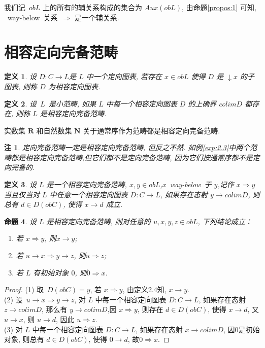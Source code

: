 \documentclass[c5size,a4paper,hyperref,fancyhdr,UTF8]{ctexart}
\theoremstyle{nonumberplain}
\newtheorem{proof}{证明}
\newtheorem{notation}{注}
\newtheorem{definition}{定义}[section]
\newtheorem{proposition}[definition]{命题}
\theoremstyle{nonumberplain}
\newtheorem{proof}{证}
\newtheorem{notation}{注}
\begin{document}
我们记~$obL$ 上的所有的辅关系构成的集合为 $Aux(obL)$, 由命题\ref{propos:1} 可知, ~way-below~关系~$\Rightarrow$ 是一个辅关系.


\section{相容定向完备范畴}

\begin{definition}
  设 $D:C\rightarrow L$是 $L$ 中一个定向图表, 若存在 $x\in obL$ 使得 $D$ 是 $\downarrow x$ 的子图表, 则称 $D$ 为相容定向图表.
\end{definition}

\begin{definition}
  设~$L$~是小范畴, 如果 $L$ 中每一个相容定向图表 $D$ 的上确界 $colim D$ 都存在, 则称 $L$ 是相容定向完备范畴.
\end{definition}

\begin{example}\label{exp:2.3}
  实数集 $\mathbf{R}$ 和自然数集 $\mathbf{N}$ 关于通常序作为范畴都是相容定向完备范畴.
\end{example}

\begin{notation}
  定向完备范畴一定是相容定向完备范畴, 但反之不然. 如例\ref{exp:2.3}中两个范畴都是相容定向完备范畴,但它们都不是定向完备范畴, 因为它们按通常序都不是定向完备的.
\end{notation}

\begin{definition}
  设 $L$ 是一个相容定向完备范畴, $x,y\in obL$,$x$~way-below~于 $y$,记作 $x\Rightarrow y$ 当且仅当对 $L$ 中任意一个相容定向图表 $D:C\rightarrow L$, 如果存在态射 $y\rightarrow colim D$, 则总有 $d\in D(obC)$, 使得 $x\rightarrow d$ 成立.
\end{definition}

\begin{proposition}\label{prop:2.5}
  设 $L$ 是相容定向完备范畴, 则对任意的 $u,x,y,z\in obL$, 下列结论成立：
  \begin{enumerate}
    \item 若 $x\Rightarrow y$, 则$x\rightarrow y$;
    \item 若 $u\rightarrow x\Rightarrow y\rightarrow z$, 则$u\Rightarrow z$;
    \item 若 $L$ 有初始对象 $0$, 则$0\Rightarrow x$.
  \end{enumerate}
\end{proposition}

\begin{proof}
  (1) 取~$D(obC)={y}$, 若 $x\Rightarrow y$, 由定义2.4知, $x\rightarrow y$.\\
  \indent (2) 设~$u\rightarrow x\Rightarrow y\rightarrow z$, 对 $L$ 中每一个相容定向图表 $D:C\rightarrow L$, 如果存在态射 $z\rightarrow colim D$, 那么有 $y\rightarrow colimD$,因 $x\Rightarrow y$, 则存在 $d\in D(obC)$, 使得 $x\rightarrow d$, 又 $u\rightarrow x$, 则 $u\rightarrow d$, 因此 $u\Rightarrow z$.\\
  \indent (3) 对 $L$ 中每一个相容定向图表 $D:C\rightarrow L$, 如果存在态射 $x\rightarrow colim D$, 因0是初始对象, 则总有 $d\in D(obC)$, 使得 $0\rightarrow d$, 故$0\Rightarrow x$.
\end{proof}
\end{document}
